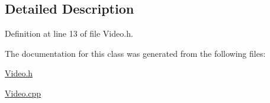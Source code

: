\subsection{Detailed Description}


Definition at line 13 of file Video.\+h.



The documentation for this class was generated from the following files\+:\begin{DoxyCompactItemize}
\item 
\mbox{\hyperlink{_video_8h}{Video.\+h}}\item 
\mbox{\hyperlink{_video_8cpp}{Video.\+cpp}}\end{DoxyCompactItemize}
